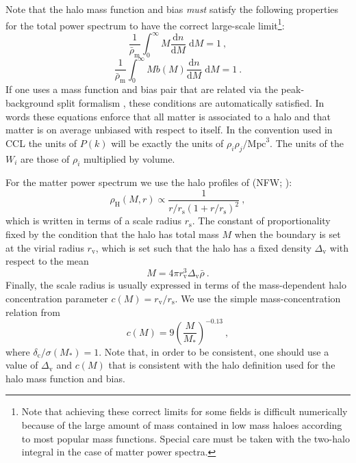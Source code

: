 \documentclass[\docopts]{\docclass}
\begin{document}
Note that the halo mass function and bias \emph{must} satisfy the following
properties for the total power spectrum to have the correct large-scale
limit\footnote{Note that achieving these correct limits for some fields is
difficult numerically because of the large amount of mass contained in low mass
haloes according to most popular mass functions. Special care must be taken with
the two-halo integral in the case of matter power spectra.}:
\begin{equation}
\frac{1}{\bar\rho_\mathrm{m}}\int_0^\infty M\frac{\mathrm{d}n}{\mathrm{d}M}\;\mathrm{d}M=1\ ,
\label{eq:mf_normalisation}
\end{equation}
\begin{equation}
\frac{1}{\bar\rho_\mathrm{m}}\int_0^\infty Mb(M)\frac{\mathrm{d}n}{\mathrm{d}M}\;\mathrm{d}M=1\ .
\label{eq:bias_normalisation}
\end{equation}
If one uses a mass function and bias pair that are related via the
peak-background split formalism \citep{Mo1996,Sheth2001}, these conditions are
automatically satisfied. In words these equations enforce that all matter is
associated to a halo and that matter is on average unbiased with respect to
itself. In the convention used in CCL the units of $P(k)$ will be exactly the
units of $\rho_i\rho_j / \mathrm{Mpc}^3$. The units of the $W_i$ are those of
$\rho_i$ multiplied by volume.

For the matter power spectrum we use the halo profiles of \citeauthor*{Navarro1997} (NFW; \citeyear{Navarro1997}):
\begin{equation}
\rho_\mathrm{H}(M,r)\propto\frac{1}{r/r_\mathrm{s}(1+r/r_\mathrm{s})^2}\ ,
\label{eq:NFW_profile}
\end{equation}
which is written in terms of a scale radius $r_\mathrm{s}$. The constant of
proportionality fixed by the condition that the halo has total mass $M$ when the
boundary is set at the virial radius $r_\mathrm{v}$, which is set such that the
halo has a fixed density $\Delta_\mathrm{v}$ with respect to the mean
\begin{equation}
M=4\pi r_\mathrm{v}^3\Delta_\mathrm{v}\bar\rho\ .
\label{eq:virial_radius}
\end{equation}
Finally, the scale radius is usually expressed in terms of the mass-dependent
halo concentration parameter $c(M)=r_\mathrm{v}/r_\mathrm{s}$. We use the simple
mass-concentration relation from \cite{Bullock2001}
\begin{equation}
c(M)=9\left(\frac{M}{M_*}\right)^{-0.13}\ ,
\end{equation}
where $\delta_\mathrm{c}/\sigma(M_*)=1$.
Note that, in order to be consistent, one should use a value of
$\Delta_\mathrm{v}$ and $c(M)$ that is consistent with the halo definition used
for the halo mass function and bias.
\end{document}
